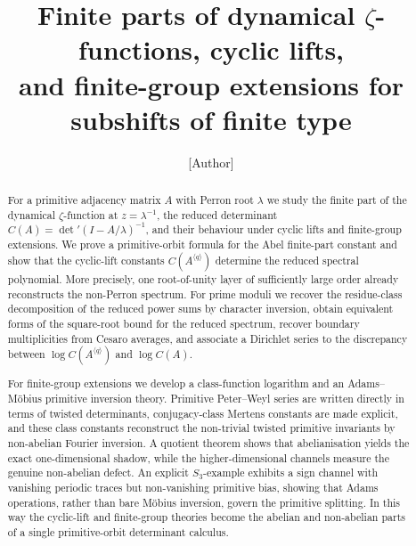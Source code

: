 \documentclass[11pt,a4paper]{amsart}
\title[Finite parts of dynamical $\zeta$-functions]{Finite parts of dynamical $\zeta$-functions, cyclic lifts,\\
and finite-group extensions for subshifts of finite type}
\author{[Author]}
\date{}
\theoremstyle{plain}
\theoremstyle{definition}
\theoremstyle{remark}
\begin{document}
\begin{abstract}
For a primitive adjacency matrix $A$ with Perron root $\lambda$ we
study the finite part of the dynamical $\zeta$-function at
$z=\lambda^{-1}$, the reduced determinant
$C(A)=\det'(I-A/\lambda)^{-1}$, and their behaviour under cyclic lifts
and finite-group extensions. We prove a primitive-orbit formula for
the Abel finite-part constant and show that the cyclic-lift constants
$C(A^{\langle q\rangle})$ determine the reduced spectral polynomial.
More precisely, one root-of-unity layer of sufficiently large order
already reconstructs the non-Perron spectrum. For prime moduli we
recover the residue-class decomposition of the reduced power sums by
character inversion, obtain equivalent forms of the square-root bound
for the reduced spectrum, recover boundary multiplicities from Cesaro
averages, and associate a Dirichlet series to the discrepancy between
$\log C(A^{\langle q\rangle})$ and $\log C(A)$.

For finite-group extensions we develop a class-function logarithm and
an Adams--M\"obius primitive inversion theory. Primitive Peter--Weyl
series are written directly in terms of twisted determinants,
conjugacy-class Mertens constants are made explicit, and these class
constants reconstruct the non-trivial twisted primitive invariants by
non-abelian Fourier inversion. A quotient theorem shows that
abelianisation yields the exact one-dimensional shadow, while the
higher-dimensional channels measure the genuine non-abelian defect. An
explicit \(S_3\)-example exhibits a sign channel with vanishing
periodic traces but non-vanishing primitive bias, showing that Adams
operations, rather than bare M\"obius inversion, govern the primitive
splitting. In this way the cyclic-lift and finite-group theories
become the abelian and non-abelian parts of a single primitive-orbit
determinant calculus.
\end{abstract}


\maketitle










\end{document}

